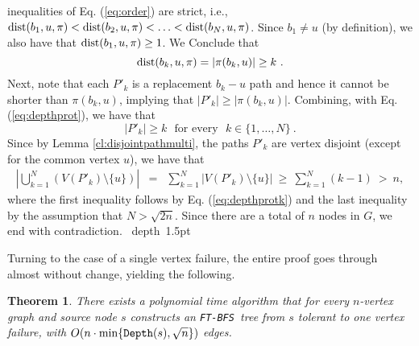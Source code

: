 \documentclass[12pt]{article}
\newtheorem{theorem}{Theorem}[section]
\newcommand{\dist}{\mbox{\rm dist}}
\def\blackslug{\hbox{\hskip 1pt \vrule width 4pt height 8pt
    depth 1.5pt \hskip 1pt}}
\def\QED{\quad\blackslug\lower 8.5pt\null\par}
\def\Depth{\mbox{\tt Depth}}
\def\FTBFS{\mbox{\tt FT-BFS}}
\begin{document}
inequalities of Eq. (\ref{eq:order}) are strict, i.e.,
$\dist(b_1, u,\pi)<\dist(b_2, u,\pi)< \ldots < \dist(b_N, u,\pi)$.
Since $b_1 \neq u$ (by definition),
we also have that
$\dist(b_1, u,\pi)\geq 1$. We Conclude that
\begin{equation}
\label{eq:depthprot}
\dist(b_k, u,\pi)=|\pi(b_k, u)|\geq k~.
\end{equation}
Next, note that each $P'_k$ is a replacement $b_k-u$ path and hence it cannot be shorter than $\pi(b_k, u)$, implying that $|P'_k|\geq |\pi(b_k, u)|$. Combining, with Eq. (\ref{eq:depthprot}), we have that
\begin{equation}
\label{eq:depthprotk}
|P'_k| \geq k \mbox{~~for every~~} k \in \{1, \ldots, N\}~.
\end{equation}
Since by Lemma \ref{cl:disjointpathmulti}, the paths $P'_k$ are vertex disjoint (except for the common vertex $u$), we have that
\begin{eqnarray*}
\left |\bigcup_{k=1}^N (V(P'_k)\setminus \{u\}) \right|&=&\sum_{k=1}^N |V(P'_k)\setminus \{u\}|~\geq~ \sum_{k=1}^N (k-1)~ > ~n,
\end{eqnarray*}
where the first inequality follows by Eq. (\ref{eq:depthprotk}) and the last inequality by the assumption that $N>\sqrt{2n}$.
Since there are a total of $n$ nodes in $G$, we end with contradiction.
\QED

Turning to the case of a single vertex failure, the entire
proof goes through almost without change, yielding the following.
\begin{theorem}
\label{thm:vertexonef}
There exists a polynomial time algorithm that for every $n$-vertex graph
and source node $s$ constructs  an \FTBFS\ tree from $s$
tolerant to one vertex failure,
with $O(n \cdot \min\{\Depth(s), \sqrt{n}\})$ edges.
\end{theorem}
\end{document}
